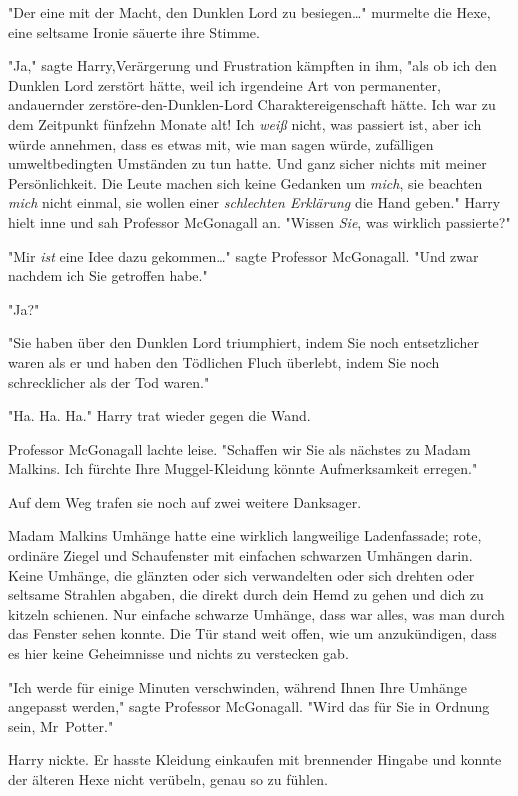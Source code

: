{"Der eine mit der Macht, den Dunklen Lord zu besiegen…" murmelte die Hexe, eine seltsame Ironie säuerte ihre Stimme.

"Ja," sagte Harry,Verärgerung und Frustration kämpften in ihm, "als ob ich den Dunklen Lord zerstört hätte, weil ich irgendeine Art von permanenter, andauernder zerstöre-den-Dunklen-Lord Charaktereigenschaft hätte. Ich war zu dem Zeitpunkt fünfzehn Monate alt! Ich \emph{weiß} nicht, was passiert ist, aber ich würde annehmen, dass es etwas mit, wie man sagen würde, zufälligen umweltbedingten Umständen zu tun hatte. Und ganz sicher nichts mit meiner Persönlichkeit. Die Leute machen sich keine Gedanken um \emph{mich}, sie beachten \emph{mich} nicht einmal, sie wollen einer \emph{schlechten Erklärung} die Hand geben." Harry hielt inne und sah Professor McGonagall an. "Wissen \emph{Sie}, was wirklich passierte?"

"Mir \emph{ist} eine Idee dazu gekommen…" sagte Professor McGonagall. "Und zwar nachdem ich Sie getroffen habe."

"Ja?"

"Sie haben über den Dunklen Lord triumphiert, indem Sie noch entsetzlicher waren als er und haben den Tödlichen Fluch überlebt, indem Sie noch schrecklicher als der Tod waren."

"Ha. Ha. Ha." Harry trat wieder gegen die Wand.

Professor McGonagall lachte leise. "Schaffen wir Sie als nächstes zu Madam Malkins. Ich fürchte Ihre Muggel-Kleidung könnte Aufmerksamkeit erregen."

Auf dem Weg trafen sie noch auf zwei weitere Danksager.

Madam Malkins Umhänge hatte eine wirklich langweilige Ladenfassade; rote, ordinäre Ziegel und Schaufenster mit einfachen schwarzen Umhängen darin. Keine Umhänge, die glänzten oder sich verwandelten oder sich drehten oder seltsame Strahlen abgaben, die direkt durch dein Hemd zu gehen und dich zu kitzeln schienen. Nur einfache schwarze Umhänge, dass war alles, was man durch das Fenster sehen konnte. Die Tür stand weit offen, wie um anzukündigen, dass es hier keine Geheimnisse und nichts zu verstecken gab.

"Ich werde für einige Minuten verschwinden, während Ihnen Ihre Umhänge angepasst werden," sagte Professor McGonagall. "Wird das für Sie in Ordnung sein, Mr~Potter."

Harry nickte. Er hasste Kleidung einkaufen mit brennender Hingabe und konnte der älteren Hexe nicht verübeln, genau so zu fühlen.

}
